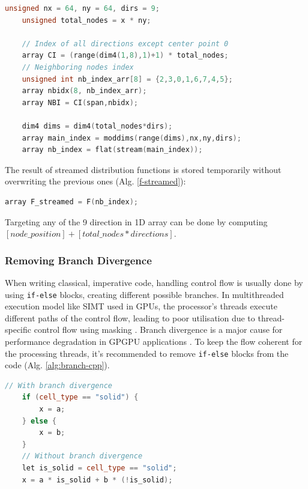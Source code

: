 \begin{lstlisting}[language=Cpp, caption=Creating ``current" (or main) index and neighboring index.]
	unsigned nx = 64, ny = 64, dirs = 9;
	unsigned total_nodes = x * ny;
	
	// Index of all directions except center point 0
	array CI = (range(dim4(1,8),1)+1) * total_nodes;
	// Neighboring nodes index
	unsigned int nb_index_arr[8] = {2,3,0,1,6,7,4,5};
	array nbidx(8, nb_index_arr);
	array NBI = CI(span,nbidx);
	
	dim4 dims = dim4(total_nodes*dirs);
	array main_index = moddims(range(dims),nx,ny,dirs);
	array nb_index = flat(stream(main_index));
\end{lstlisting}

The result of streamed distribution functions is stored temporarily without overwriting the previous ones (Alg. \ref{f-streamed}):

\begin{lstlisting}[language=Cpp, caption=Streaming step., label=f-streamed]
	array F_streamed = F(nb_index);
\end{lstlisting}

Targeting any of the 9 direction in 1D array can be done by computing $[node\_position] + [total\_nodes * directions]$. 

\subsubsection{Removing Branch Divergence}
When writing classical, imperative code, handling control flow is usually done by using \texttt{if-else} blocks, creating different possible branches. In multithreaded execution model like SIMT used in GPUs, the processor's threads execute different paths of the control flow, leading to poor utilisation due to thread-specific control flow using masking \cite{delboscOptimizedImplementationLattice2014}. Branch divergence is a major cause for performance degradation in GPGPU applications \cite{TAN2017649}. To keep the flow coherent for the processing threads, it's recommended to remove \texttt{if-else} blocks from the code (Alg. \ref{alg:branch-cpp}).

\begin{lstlisting}[language=Cpp, caption=Pseudo-code showcasing the removal of branch divergence by removing if statement., label=alg:branch-pseudo]
	// With branch divergence
	if (cell_type == "solid") {
		x = a;
	} else {
		x = b;
	}
	// Without branch divergence
	let is_solid = cell_type == "solid";
	x = a * is_solid + b * (!is_solid);
\end{lstlisting}


